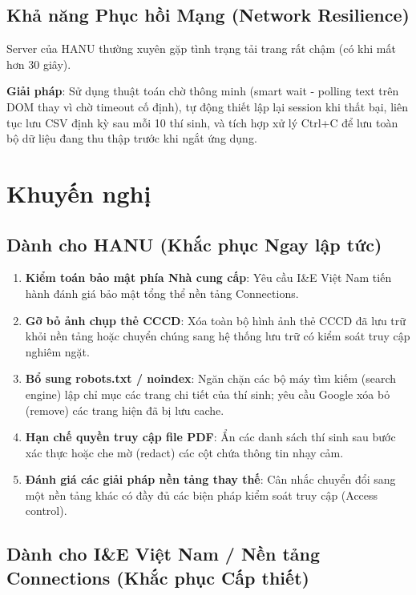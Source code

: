 \documentclass[12pt,a4paper]{article}
\begin{document}
\subsection{Khả năng Phục hồi Mạng (Network Resilience)}

Server của HANU thường xuyên gặp tình trạng tải trang rất chậm (có khi mất hơn 30 giây).

\textbf{Giải pháp}: Sử dụng thuật toán chờ thông minh (smart wait - polling text trên DOM thay vì chờ timeout cố định), tự động thiết lập lại session khi thất bại, liên tục lưu CSV định kỳ sau mỗi 10 thí sinh, và tích hợp xử lý Ctrl+C để lưu toàn bộ dữ liệu đang thu thập trước khi ngắt ứng dụng.

\section{Khuyến nghị}
\label{sec:recommendations}

\subsection{Dành cho HANU (Khắc phục Ngay lập tức)}

\begin{enumerate}
    \item \textbf{Kiểm toán bảo mật phía Nhà cung cấp}: Yêu cầu I\&E Việt Nam tiến hành đánh giá bảo mật tổng thể nền tảng Connections.
    \item \textbf{Gỡ bỏ ảnh chụp thẻ CCCD}: Xóa toàn bộ hình ảnh thẻ CCCD đã lưu trữ khỏi nền tảng hoặc chuyển chúng sang hệ thống lưu trữ có kiểm soát truy cập nghiêm ngặt.
    \item \textbf{Bổ sung robots.txt / noindex}: Ngăn chặn các bộ máy tìm kiếm (search engine) lập chỉ mục các trang chi tiết của thí sinh; yêu cầu Google xóa bỏ (remove) các trang hiện đã bị lưu cache.
    \item \textbf{Hạn chế quyền truy cập file PDF}: Ẩn các danh sách thí sinh sau bước xác thực hoặc che mờ (redact) các cột chứa thông tin nhạy cảm.
    \item \textbf{Đánh giá các giải pháp nền tảng thay thế}: Cân nhắc chuyển đổi sang một nền tảng khác có đầy đủ các biện pháp kiểm soát truy cập (Access control).
\end{enumerate}

\subsection{Dành cho I\&E Việt Nam / Nền tảng Connections (Khắc phục Cấp thiết)}
\end{document}
